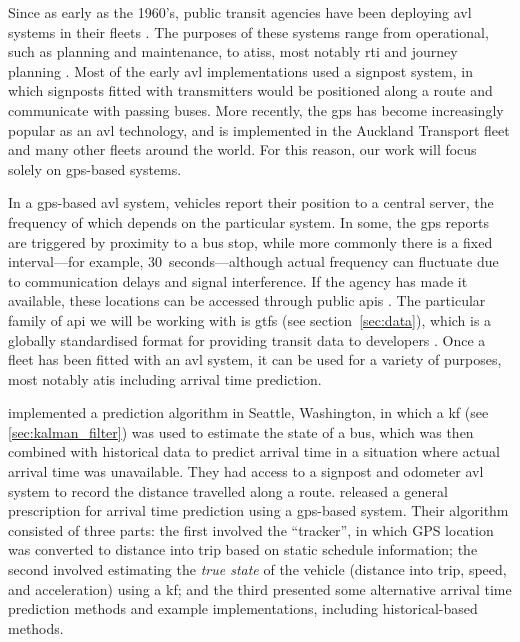 \documentclass[12pt,a4paper]{article}
\begin{document}




Since as early as the 1960's, public transit agencies have been deploying \gls{avl} systems
in their fleets \citep{tcrp:1997}.
The purposes of these systems range from operational, such as planning and maintenance, 
to \glspl{atis}, most notably \gls{rti} and journey planning \citep{tcrp:2003}.
Most of the early \gls{avl} implementations used a signpost system,
in which signposts fitted with transmitters would be positioned along a route
and communicate with passing buses.
More recently, the \gls{gps} has become increasingly popular as an \gls{avl} technology,
and is implemented in the Auckland Transport fleet
and many other fleets around the world.
For this reason, our work will focus solely on \gls{gps}-based systems.


In a \gls{gps}-based \gls{avl} system, vehicles report their position to a central server,
the frequency of which depends on the particular system.
In some, the \gls{gps} reports are triggered by proximity to a bus stop,
while more commonly there is a fixed interval---for example, 30~seconds---although
actual frequency can fluctuate due to communication delays and signal interference.
If the agency has made it available, 
these locations can be accessed through public \glspl{api}
\citep{tcrp:2003}.
The particular family of \gls{api} we will be working with is \gls{gtfs}
(see section~\ref{sec:data}),
which is a globally standardised format for providing transit data to developers
\citep{gtfs}.
Once a fleet has been fitted with an \gls{avl} system, 
it can be used for a variety of purposes, most notably \gls{atis} including arrival time prediction.


\cite{dailey:2001} implemented a prediction algorithm in Seattle, Washington,
in which a \gls{kf} (see \cref{sec:kalman_filter}) was used to estimate the state of a bus, 
which was then combined with historical data to predict arrival time in a situation where
actual arrival time was unavailable.
They had access to a signpost and odometer \gls{avl} system to record the distance travelled along a route.
\cite{cathey-dailey:2003} released a general prescription for arrival time prediction using
a \gls{gps}-based system.
Their algorithm consisted of three parts:
the first involved the ``tracker'', in which GPS location was converted to distance into trip
based on static schedule information;
the second involved estimating the \emph{true state} of the vehicle (distance into trip, speed, 
and acceleration) using a \gls{kf};
and the third presented some alternative arrival time prediction methods and example implementations,
including historical-based methods.
\end{document}
